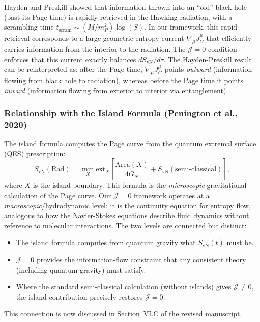 \documentclass[11pt,a4paper]{article}
\begin{document}
Hayden and Preskill showed that information thrown into an ``old'' black hole (past its Page time) is rapidly retrieved in the Hawking radiation, with a scrambling time $t_{\text{scram}} \sim (M/m_P^2) \log(S)$. In our framework, this rapid retrieval corresponds to a large geometric entropy current $\nabla_\mu J^\mu_G$ that efficiently carries information from the interior to the radiation. The $\mathcal{J}=0$ condition enforces that this current exactly balances $dS_{\text{vN}}/d\tau$. The Hayden-Preskill result can be reinterpreted as: after the Page time, $\nabla_\mu J^\mu_G$ points \emph{outward} (information flowing from black hole to radiation), whereas before the Page time it points \emph{inward} (information flowing from exterior to interior via entanglement).

\subsubsection*{Relationship with the Island Formula (Penington et al., 2020)}

The island formula computes the Page curve from the quantum extremal surface (QES) prescription:
\begin{equation}
S_{\text{vN}}(\text{Rad}) = \min_{X} \text{ext}_{X} \left[ \frac{\text{Area}(X)}{4G_N} + S_{\text{vN}}(\text{semi-classical}) \right],
\end{equation}
where $X$ is the island boundary. This formula is the \emph{microscopic} gravitational calculation of the Page curve. Our $\mathcal{J}=0$ framework operates at a \emph{macroscopic}/hydrodynamic level: it is the continuity equation for entropy flow, analogous to how the Navier-Stokes equations describe fluid dynamics without reference to molecular interactions. The two levels are connected but distinct:
\begin{itemize}[leftmargin=*]
\item The island formula computes from quantum gravity what $S_{\text{vN}}(t)$ must be.
\item $\mathcal{J}=0$ provides the information-flow constraint that any consistent theory (including quantum gravity) must satisfy.
\item Where the standard semi-classical calculation (without islands) gives $\mathcal{J} \neq 0$, the island contribution precisely restores $\mathcal{J}=0$.
\end{itemize}

This connection is now discussed in Section~VI.C of the revised manuscript.
\end{document}
